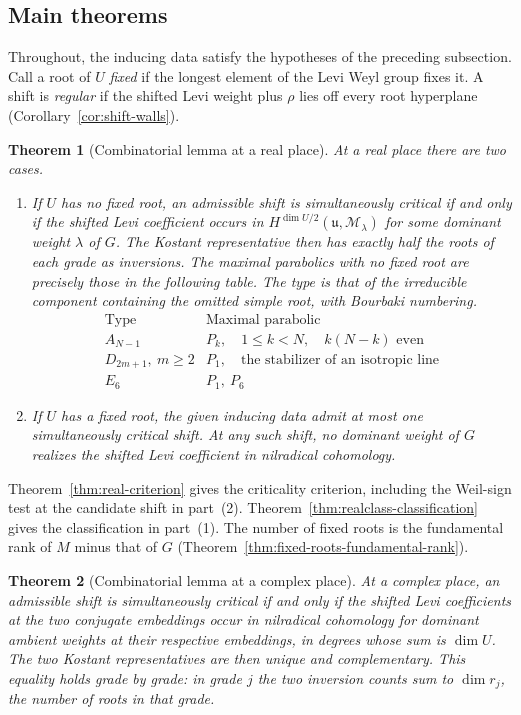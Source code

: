 \documentclass[12pt]{amsart}
\numberwithin{equation}{section}
\theoremstyle{plain}
\newtheorem{introtheorem}{Theorem}
\theoremstyle{definition}
\theoremstyle{remark}
\newcommand{\cM}{\mathcal M}
\begin{document}
\subsection{Main theorems}

Throughout, the inducing data satisfy the hypotheses of the preceding subsection. Call a root of $U$ \emph{fixed} if the longest element of the Levi Weyl group fixes it. A shift is \emph{regular} if the shifted
Levi weight plus $\rho$ lies off every root hyperplane (Corollary~\ref{cor:shift-walls}).

\begin{introtheorem}[Combinatorial lemma at a real place]
\label{thm:intro-real}
At a real place there are two cases.
\begin{enumerate}
\item If $U$ has no fixed root, an admissible shift is simultaneously critical if and only if the shifted Levi coefficient occurs in $H^{\dim U/2}(\mathfrak u,\cM_\lambda)$ for some dominant weight $\lambda$ of $G$. The Kostant representative then has exactly half the roots of each grade as inversions. The maximal parabolics with no fixed root are precisely those in the following table. The type is that of the irreducible component containing the omitted simple root, with Bourbaki numbering.
\[
\begin{array}{c|l}
\text{Type} & \text{Maximal parabolic} \\ \hline
A_{N-1} & P_k,\quad 1\le k<N,\quad k(N-k)\text{ even} \\
D_{2m+1},\ m\ge2 & P_1,\quad\text{the stabilizer of an isotropic line} \\
E_6 & P_1,\ P_6
\end{array}
\]
\item If $U$ has a fixed root, the given inducing data admit at most one simultaneously critical shift. At any such shift, no dominant weight of $G$ realizes the shifted Levi coefficient in nilradical cohomology.
\end{enumerate}
\end{introtheorem}

Theorem~\ref{thm:real-criterion} gives the criticality criterion, including the Weil-sign test at the candidate shift in part~(2). Theorem~\ref{thm:realclass-classification} gives the classification in part~(1). The number of fixed roots is the fundamental rank of $M$ minus that of $G$ (Theorem~\ref{thm:fixed-roots-fundamental-rank}).

\begin{introtheorem}[Combinatorial lemma at a complex place]
\label{thm:intro-complex}
At a complex place, an admissible shift is simultaneously critical if and only if the shifted Levi coefficients at the two conjugate embeddings occur in nilradical cohomology for dominant ambient weights at their respective embeddings, in degrees whose sum is $\dim U$. The two Kostant representatives are then unique and complementary. This equality holds grade by grade: in grade $j$ the two inversion counts sum to $\dim r_j$, the number of roots in that grade.
\end{introtheorem}
\end{document}
